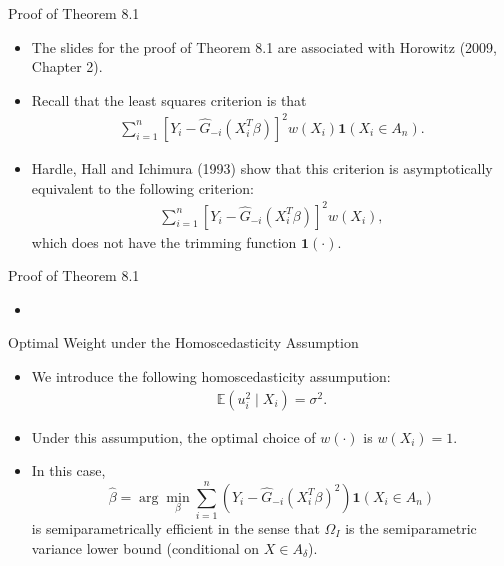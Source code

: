 \documentclass[xcolor=svgnames,dvipdfmx,cjk]{beamer}
\theoremstyle{example}
\def\E{\mathbb{E}}
\begin{document}
\begin{frame}{Proof of Theorem 8.1}
  \begin{itemize}
    \item The slides for the proof of Theorem 8.1 
          are associated with Horowitz (2009, Chapter 2).
    \item Recall that the least squares criterion is that
          \begin{align*}
            \sum_{i=1}^{n}  
            \left[ Y_i - \hat{G}_{-i}(X_i^{T}\beta) \right]^2 
            w(X_i) \mathbf{1}(X_i \in A_n).
          \end{align*}
    \item Hardle, Hall and Ichimura (1993) show that this criterion 
          is asymptotically equivalent to the following criterion:
          \begin{align*}
            \sum_{i=1}^{n}  
            \left[ Y_i - \hat{G}_{-i}(X_i^{T}\beta) \right]^2 
            w(X_i),
          \end{align*}
          which does not have the trimming function $\mathbf{1}(\cdot)$.
  \end{itemize}
\end{frame}

\begin{frame}{Proof of Theorem 8.1}
  \begin{itemize}
    \item 


  \end{itemize}
\end{frame}



\begin{frame}{Optimal Weight under the Homoscedasticity Assumption}
\begin{itemize}
  \item We introduce the following homoscedasticity assumpution:
        \begin{align*}
          \E(u_i^2 \mid X_i) = \sigma^2.
        \end{align*}
  \item Under this assumpution, the optimal choice of $w(\cdot)$ is $w(X_i)=1$.
  \item In this case, 
        \[ \hat{\beta} = \arg\min_{\beta} \sum_{i=1}^{n} (Y_i - \hat{G}_{-i}(X_i^{T}\beta)^2)\mathbf{1}(X_i \in A_n) \]
        is \alert{semiparametrically efficient} in the sense that 
        $\Omega_I$ is \alert{the semiparametric variance lower bound} (conditional on $X \in A_\delta$).
\end{itemize}
\end{frame}
\end{document}
